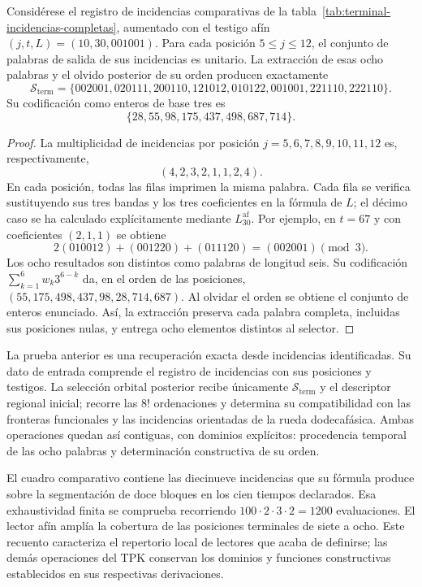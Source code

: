 \begin{proposition}
\label{prop:repertorio-terminal-ocho-incidencias}
Considérese el registro de incidencias comparativas de la
tabla~\ref{tab:terminal-incidencias-completas}, aumentado con el testigo
afín $(j,t,L)=(10,30,001001)$. Para cada posición $5\leq j\leq12$, el
conjunto de palabras de salida de sus incidencias es unitario. La
extracción de esas ocho palabras y el olvido posterior de su orden
producen exactamente
\[
 \mathcal S_{\mathrm{term}}=
 \{002001,020111,200110,121012,010122,001001,221110,222110\}.
\]
Su codificación como enteros de base tres es
\[
 \{28,55,98,175,437,498,687,714\}.
\]
\end{proposition}
\begin{proof}
La multiplicidad de incidencias por posición $j=5,6,7,8,9,10,11,12$
es, respectivamente,
\[
 (4,2,3,2,1,1,2,4).
\]
En cada posición, todas las filas imprimen la misma palabra. Cada fila
se verifica sustituyendo sus tres bandas y los tres coeficientes en la
fórmula de $L$; el décimo caso se ha calculado explícitamente mediante
$L^{\mathrm{af}}_{30}$. Por ejemplo, en $t=67$ y con coeficientes
$(2,1,1)$ se obtiene
\[
 2(010012)+(001220)+(011120)=(002001)\pmod3.
\]
Los ocho resultados son distintos como palabras de longitud seis. Su
codificación $\sum_{k=1}^{6}w_k3^{6-k}$ da, en el orden de las
posiciones, $(55,175,498,437,98,28,714,687)$. Al olvidar el orden se
obtiene el conjunto de enteros enunciado. Así, la extracción preserva
cada palabra completa, incluidas sus posiciones nulas, y entrega ocho
elementos distintos al selector.
\end{proof}

La prueba anterior es una recuperación exacta desde incidencias
identificadas. Su dato de entrada comprende el registro de incidencias
con sus posiciones y testigos. La selección orbital posterior recibe
únicamente $\mathcal S_{\mathrm{term}}$ y el descriptor regional inicial;
recorre las $8!$ ordenaciones y determina su compatibilidad con las
fronteras funcionales y las incidencias orientadas de la rueda
dodecafásica. Ambas operaciones quedan así contiguas, con dominios
explícitos: procedencia temporal de las ocho palabras y determinación
constructiva de su orden.

El cuadro comparativo contiene las diecinueve incidencias que su fórmula
produce sobre la segmentación de doce bloques en los cien tiempos
declarados. Esa exhaustividad finita se comprueba recorriendo
$100\cdot2\cdot3\cdot2=1200$ evaluaciones. El lector afín amplía la
cobertura de las posiciones terminales de siete a ocho. Este recuento
caracteriza el repertorio local de lectores que acaba de definirse;
las demás operaciones del TPK conservan los dominios y funciones
constructivas establecidos en sus respectivas derivaciones.


